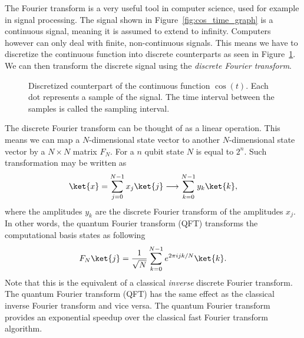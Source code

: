 \documentclass[11pt, notitlepage]{report}
\begin{document}
The Fourier transform is a very useful tool in computer science, used for example in signal processing. The signal shown in Figure~\ref{fig:cos_time_graph} is a continuous signal, meaning it is assumed to extend to infinity. Computers however can only deal with finite, non-continuous signals. This means we have to discretize the continuous function into discrete counterparts as seen in Figure~\ref{fig:cos_discrete_time_graph}. We can then transform the discrete signal using the \emph{discrete Fourier transform}.
\begin{figure}[ht]
  \centering
  \caption{Discretized counterpart of the continuous function $\cos(t)$. Each dot represents a sample of the signal. The time interval between the samples is called the sampling interval.}
  \label{fig:cos_discrete_time_graph}
\end{figure}  

The discrete Fourier transform can be thought of as a linear operation. This means we can map a $N$-dimensional state vector to another $N$-dimensional state vector by a $N \times N$ matrix $F_N$. For a $n$ qubit state $N$ is equal to $2^n$. Such transformation may be written as
\begin{equation}
  \ket{x} = \sum_{j=0}^{N-1}x_j\ket{j} \longrightarrow \sum_{k=0}^{N-1}y_k\ket{k},
\end{equation} 
where the amplitudes $y_k$ are the discrete Fourier transform of the amplitudes $x_j$. In other words, the quantum Fourier transform (QFT) transforms the computational basis states as following
\begin{equation} \label{eq:qft}
  F_N\ket{j} = \dfrac{1}{\sqrt N}\sum_{k=0}^{N-1}e^{2\pi i jk/N}\ket{k}.
\end{equation}
Note that this is the equivalent of a classical \emph{inverse} discrete Fourier transform. The quantum Fourier transform (QFT) has the same effect as the classical inverse Fourier transform and vice versa. The quantum Fourier transform provides an exponential speedup over the classical fast Fourier transform algorithm.
\end{document}
